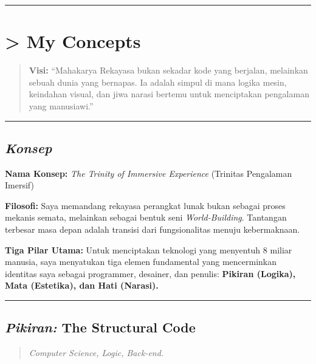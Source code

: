 \documentclass[
  letterpaper,
  DIV=11,
  numbers=noendperiod]{scrreprt}
\begin{document}
\begin{center}\rule{0.5\linewidth}{0.5pt}\end{center}


\chapter{\textgreater{} My Concepts}\label{my-concepts}

\begin{quote}
\textbf{Visi:} ``Mahakarya Rekayasa bukan sekadar kode yang berjalan,
melainkan sebuah dunia yang bernapas. Ia adalah simpul di mana logika
mesin, keindahan visual, dan jiwa narasi bertemu untuk menciptakan
pengalaman yang manusiawi.''
\end{quote}

\begin{center}\rule{0.5\linewidth}{0.5pt}\end{center}

\section{\texorpdfstring{\textbf{\emph{Konsep}}}{Konsep}}\label{konsep}

\textbf{Nama Konsep:} \emph{The Trinity of Immersive Experience}
(Trinitas Pengalaman Imersif)

\textbf{Filosofi:} Saya memandang rekayasa perangkat lunak bukan sebagai
proses mekanis semata, melainkan sebagai bentuk seni
\emph{World-Building}. Tantangan terbesar masa depan adalah transisi
dari fungsionalitas menuju kebermaknaan.

\textbf{Tiga Pilar Utama:} Untuk menciptakan teknologi yang menyentuh 8
miliar manusia, saya menyatukan tiga elemen fundamental yang
mencerminkan identitas saya sebagai programmer, desainer, dan penulis:
\textbf{Pikiran (Logika), Mata (Estetika), dan Hati (Narasi).}

\begin{center}\rule{0.5\linewidth}{0.5pt}\end{center}

\section{\texorpdfstring{\emph{Pikiran:} The Structural
Code}{Pikiran: The Structural Code}}\label{pikiran-the-structural-code}

\begin{quote}
\emph{Computer Science, Logic, Back-end.}
\end{quote}
\end{document}

